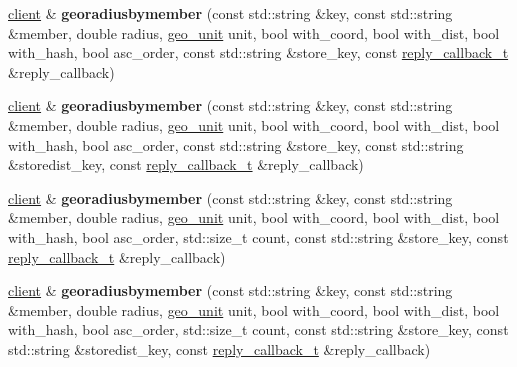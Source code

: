 \begin{DoxyCompactItemize}
\item 
\mbox{\label{classcpp__redis_1_1client_ad84f7842632adef761532d40c8e741b8}} 
\mbox{\hyperlink{classcpp__redis_1_1client}{client}} \& {\bfseries georadiusbymember} (const std\+::string \&key, const std\+::string \&member, double radius, \mbox{\hyperlink{classcpp__redis_1_1client_aa5998536fd32ff4387c89be514997620}{geo\+\_\+unit}} unit, bool with\+\_\+coord, bool with\+\_\+dist, bool with\+\_\+hash, bool asc\+\_\+order, const std\+::string \&store\+\_\+key, const \mbox{\hyperlink{classcpp__redis_1_1client_af7a65eb21aa25230bfbb0b0203c4fc04}{reply\+\_\+callback\+\_\+t}} \&reply\+\_\+callback)
\item 
\mbox{\label{classcpp__redis_1_1client_a0fd55ebd3fc2904a9e3de8e8c7fd1e28}} 
\mbox{\hyperlink{classcpp__redis_1_1client}{client}} \& {\bfseries georadiusbymember} (const std\+::string \&key, const std\+::string \&member, double radius, \mbox{\hyperlink{classcpp__redis_1_1client_aa5998536fd32ff4387c89be514997620}{geo\+\_\+unit}} unit, bool with\+\_\+coord, bool with\+\_\+dist, bool with\+\_\+hash, bool asc\+\_\+order, const std\+::string \&store\+\_\+key, const std\+::string \&storedist\+\_\+key, const \mbox{\hyperlink{classcpp__redis_1_1client_af7a65eb21aa25230bfbb0b0203c4fc04}{reply\+\_\+callback\+\_\+t}} \&reply\+\_\+callback)
\item 
\mbox{\label{classcpp__redis_1_1client_aa0ab44c2f13449d9b3d2df0023871d4e}} 
\mbox{\hyperlink{classcpp__redis_1_1client}{client}} \& {\bfseries georadiusbymember} (const std\+::string \&key, const std\+::string \&member, double radius, \mbox{\hyperlink{classcpp__redis_1_1client_aa5998536fd32ff4387c89be514997620}{geo\+\_\+unit}} unit, bool with\+\_\+coord, bool with\+\_\+dist, bool with\+\_\+hash, bool asc\+\_\+order, std\+::size\+\_\+t count, const std\+::string \&store\+\_\+key, const \mbox{\hyperlink{classcpp__redis_1_1client_af7a65eb21aa25230bfbb0b0203c4fc04}{reply\+\_\+callback\+\_\+t}} \&reply\+\_\+callback)
\item 
\mbox{\label{classcpp__redis_1_1client_a139e586e190702f5e59190292a03d6e9}} 
\mbox{\hyperlink{classcpp__redis_1_1client}{client}} \& {\bfseries georadiusbymember} (const std\+::string \&key, const std\+::string \&member, double radius, \mbox{\hyperlink{classcpp__redis_1_1client_aa5998536fd32ff4387c89be514997620}{geo\+\_\+unit}} unit, bool with\+\_\+coord, bool with\+\_\+dist, bool with\+\_\+hash, bool asc\+\_\+order, std\+::size\+\_\+t count, const std\+::string \&store\+\_\+key, const std\+::string \&storedist\+\_\+key, const \mbox{\hyperlink{classcpp__redis_1_1client_af7a65eb21aa25230bfbb0b0203c4fc04}{reply\+\_\+callback\+\_\+t}} \&reply\+\_\+callback)

\end{DoxyCompactItemize}
